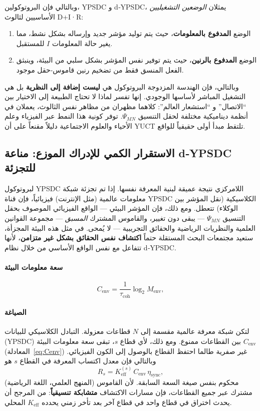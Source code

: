 \documentclass[11pt,a4paper]{article}
\begin{document}
	وبالتالي فإن البروتوكولين، YPSDC و d‑YPSDC، يمثلان \emph{الوضعين التشغيليين} الأساسيين لثالوث D+I·R:
	\begin{enumerate}[leftmargin=*]
		\item الوضع \textbf{المدفوع بالمعلومات}، حيث يتم توليد مؤشر جديد وإرساله بشكل نشط، مما يغير حالة المعلومات $I$ للمستقبل.
		\item الوضع \textbf{المدفوع بالرنين}، حيث يتم توفير نفس المؤشر بشكل سلبي من البيئة، وينبثق الفعل المنسق فقط من تضخيم رنين قاموس-حقل موجود.
	\end{enumerate}
	
	وبالتالي، فإن الهندسة المزدوجة البروتوكول هي \textbf{ليست إضافة إلى النظرية} بل هي التشغيل المباشر لأساسها الوجودي. إنها تفسر لماذا لا تحتاج الطبيعة إلى الاختيار بين ``الاتصال'' و ``استشعار العالم'': كلاهما مظهران من مظاهر نفس الثالوث، يعملان في أنظمة ديناميكية مختلفة لحقل التنسيق $\Psi_{MN}$. توفر كونية هذا النمط عبر الفيزياء وعلم الأحياء والعلوم الاجتماعية دليلاً مقنعاً على أن YUCT تلتقط مبدأ أولى حقيقياً للواقع.
	
	\subsection{الاستقرار الكمي للإدراك الموزع: مناعة d‑YPSDC للتجزئة}
	\label{subsec:quantum-stability-cognition}
	
	لبروتوكول YPSDC اللامركزي نتيجة عميقة لبنية المعرفة نفسها. إذا تم تجزئة شبكة معلومات عالمية (مثل الإنترنت) فيزيائياً، فإن قناة YPSDC الكلاسيكية (نقل المؤشر بين الوكلاء) تتعطل. ومع ذلك، فإن المؤشر البيئي — الواقع الفيزيائي الموصوف بحقل التنسيق $\Psi_{MN}$ — يبقى دون تغيير، والقاموس المشترك \emph{المسبق} — مجموعة القوانين العلمية والنظريات الرياضية والحقائق التجريبية — لا يُمحى. في مثل هذه البيئة المجزأة، ستعيد مجتمعات البحث المستقلة حتماً \textbf{اكتشاف نفس الحقائق بشكل غير متزامن}، لأنها تتفاعل مع نفس الواقع الأساسي من خلال نظام d‑YPSDC.
	
	\paragraph{سعة معلومات البيئة}
	\[
	C_{\mathrm{env}} = \frac{1}{\tau_{\mathrm{coh}}} \log_2 M_{\mathrm{env}},
	\label{eq:Cenv}
	\]
	
	\paragraph*{الصياغة}
	لتكن شبكة معرفة عالمية مقسمة إلى $N$ قطاعات معزولة. التبادل الكلاسيكي للبيانات (YPSDC) بين القطاعات ممنوع. ومع ذلك، لأي قطاع $s$، تبقى سعة معلومات البيئة $C_{\mathrm{env}}$ (المعادلة~\ref{eq:Cenv}) غير صفرية طالما احتفظ القطاع بالوصول إلى الكون الفيزيائي. وبالتالي فإن معدل اكتساب المعرفة في القطاع $s$ هو
	\[
	R_s = K_{\mathrm{eff}}^{(s)} \, C_{\mathrm{env}} \, \eta_{\mathrm{sync}},
	\]
	محكوم بنفس صيغة السعة السابقة. لأن القاموس (المنهج العلمي، اللغة الرياضية) مشترك عبر جميع القطاعات، فإن مسارات الاكتشاف \textbf{متشابكة تنسيقياً}: من المرجح أن يحدث اختراق في قطاع واحد في قطاع آخر بعد تأخر زمني يحدده $K_{\mathrm{eff}}$ المحلي.
	
\end{document}
